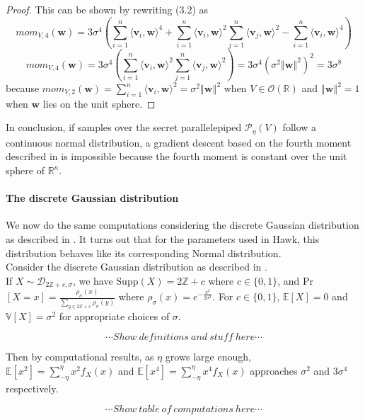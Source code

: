 \documentclass[12 pt]{article}        	%
\newcommand{\PP}[2][]{\mathcal{P}_{#1}(\mat{#2})}
\newcommand{\mat}[1]{\mathit{#1}}
\renewcommand{\vec}[1]{\mathbf{#1}}
\newcommand{\bb}[1]{\mathbb{#1}}
\begin{document}
\begin{proof}
This can be shown by rewriting (3.2) as  
\[ mom_{\mat{V}, 4}(\vec{w}) = 3\sigma^4(\sum_{i=1}^n \langle \vec{v}_i, \vec{w}\rangle^4 + \sum_{i=1}^n \langle \vec{v}_i, \vec{w} \rangle^2 \sum_{j=1}^n \langle \vec{v}_j, \vec{w}\rangle^2 - \sum_{i=1}^n\langle \vec{v}_i, \vec{w}\rangle^4 )\]
\[ mom_{\mat{V}, 4}(\vec{w}) = 3\sigma^4(\sum_{i=1}^n \langle \vec{v}_i, \vec{w}\rangle^2 \sum_{j=1}^n \langle \vec{v}_j, \vec{w}\rangle^2) = 3\sigma^4(\sigma^2\left \Vert \vec{w} \right \Vert^2)^2 = 3\sigma^8\]
because $mom_{\mat{V}, 2}(\vec{w}) = \sum_{i=1}^n \langle \vec{v}_i, \vec{w}\rangle^2 = \sigma^2 \left \Vert \vec{w} \right \Vert^2$ when $\mat{V} \in \mathcal{O}(\bb{R})$ and $\left \Vert \vec{w} \right \Vert^2 = 1$ when $\vec{w}$ lies on the unit sphere.
\end{proof}

In conclusion, if samples over the secret parallelepiped $\PP[\eta]{V}$ follow a continuous normal distribution, a gradient descent based on the fourth moment described in \cite{NR09}
is impossible because the fourth moment is constant over the unit sphere of $\bb{R}^n$.

\paragraph{The discrete Gaussian distribution}
We now do the same computations considering the discrete Gaussian distribution as described in \cite{HawkSpec24}. 
It turns out that for the parameters used in Hawk, this distribution behaves like its corresponding Normal distribution.\\ 
Consider the discrete Gaussian distribution as described in \cite{HawkSpec24}. \\
If $X \sim \mathcal{D}_{2 \bb{Z} + c, \sigma}$, we have Supp$(X) = 2 \bb{Z} + c$ where $c \in \{0, 1\}$, and Pr$[X = x] = \frac{\rho_{\sigma}(x)}{\sum_{y \in 2 \bb{Z} + c} \rho_{\sigma}(y)}$
where $\rho_{\sigma}(x) = e^{-\frac{x^2}{2 \sigma^2}}$. For $c \in \{0, 1 \}$, $\bb{E}[X] = 0$ and $\bb{V}[X] = \sigma^2$ for appropriate choices of $\sigma$.

\[\cdots Show \ definitions \ and \ stuff \ here \cdots\]

Then by computational results, as $\eta$ grows large enough, $\bb{E}[x^2] = \sum_{-\eta}^{\eta} x^2 f_X(x)$ and $\bb{E}[x^4] = \sum_{-\eta}^{\eta} x^4 f_X(x)$ approaches $\sigma^2$ and $3 \sigma^4$ respectively. 

\[\cdots Show \ table \ of \ computations \ here \cdots\]

\end{document}
